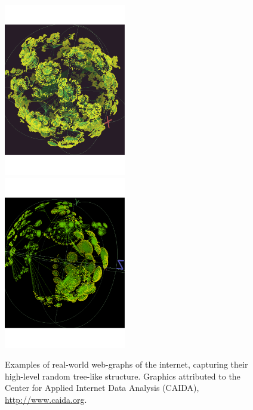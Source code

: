 \doublecol
	\begin{figure}[!htbp]
	\includegraphics[clip=true, width=0.475\textwidth]{webgraph_1}\\
	\includegraphics[clip=true, width=0.475\textwidth]{webgraph_2}
	\captionspacefig \caption{Examples of real-world web-graphs of the internet, capturing their high-level random tree-like structure. Graphics attributed to the Center for Applied Internet Data Analysis (CAIDA), \url{http://www.caida.org}.} \label{fig:webgraph}
	\end{figure}
\else
